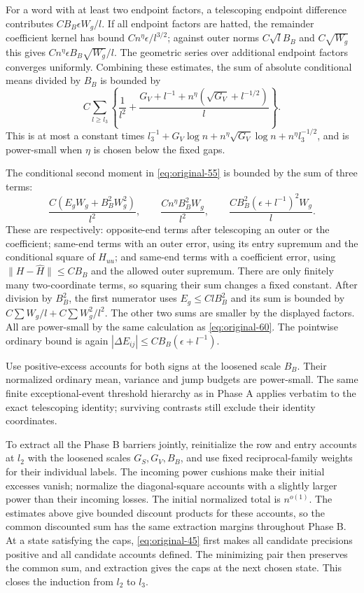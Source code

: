 For a word with at least two endpoint factors, a telescoping
endpoint difference contributes
$CB_B\epsilon W_g/l$.
If all endpoint factors are hatted, the remainder coefficient
kernel has bound $Cn^\eta\epsilon/l^{3/2}$; against outer norms
$C\sqrt lB_B$ and $C\sqrt{W_g}$ this gives
$Cn^\eta\epsilon B_B\sqrt{W_g}/l$.
The geometric series over additional endpoint factors converges
uniformly.  Combining these estimates, the sum of absolute
conditional means divided by $B_B$ is bounded by
\begin{equation}
 C\sum_{l\ge l_3}
 \left\{\frac1{l^2}
   +\frac{G_V+l^{-1}+n^\eta(\sqrt{G_V}+l^{-1/2})}{l}\right\}.
 \label{eq:original-60}
\end{equation}
This is at most a constant times
$l_3^{-1}+G_V\log n+n^\eta\sqrt{G_V}\log n
 +n^\eta l_3^{-1/2}$, and is power-small when $\eta$ is chosen
below the fixed gaps.

The conditional second moment in \eqref{eq:original-55} is bounded by
the sum of three terms:
\[
 \frac{C(E_gW_g+B_B^2W_g^2)}{l^2},\qquad
 \frac{Cn^\eta B_B^2W_g}{l^2},\qquad
 \frac{CB_B^2(\epsilon+l^{-1})^2W_g}{l}.
\]
These are respectively: opposite-end terms after telescoping an
outer or the coefficient; same-end terms with an outer error,
using its entry supremum and the conditional square of $H_{uu}$;
and same-end terms with a coefficient error, using
$\|H-\widehat H\|\le CB_B$ and the allowed outer supremum.
There are only finitely many two-coordinate terms, so squaring
their sum changes a fixed constant.
After division by $B_B^2$, the first numerator uses
$E_g\le ClB_B^2$ and its sum is bounded by
$C\sum W_g/l+ C\sum W_g^2/l^2$.
The other two sums are smaller by the displayed factors.  All
are power-small by the same calculation as
\eqref{eq:original-60}.
The pointwise ordinary bound is again
$|\Delta E_{ij}|\le CB_B(\epsilon+l^{-1})$.

Use positive-excess accounts for both signs at the loosened scale
$B_B$.  Their normalized ordinary mean, variance and jump budgets
are power-small.  The same finite exceptional-event threshold
hierarchy as in Phase A applies verbatim to the exact telescoping
identity; surviving contrasts still exclude their identity
coordinates.

To extract all the Phase B barriers jointly, reinitialize the row and
entry accounts at $l_2$ with the loosened scales $G_S,G_V,B_B$, and use
fixed reciprocal-family
weights for their individual labels.  The incoming power cushions make
their initial excesses vanish; normalize the diagonal-square accounts
with a slightly larger power than their incoming losses.  The initial
normalized total is $n^{o(1)}$.  The estimates above give bounded discount
products for these accounts, so the common
discounted sum has the same extraction margins throughout Phase B.
At a state satisfying the caps, \eqref{eq:original-45} first makes all
candidate precisions positive and all candidate accounts defined.
The minimizing pair then preserves the common sum, and extraction
gives the caps at the next chosen state.  This closes the induction
from $l_2$ to $l_3$.

